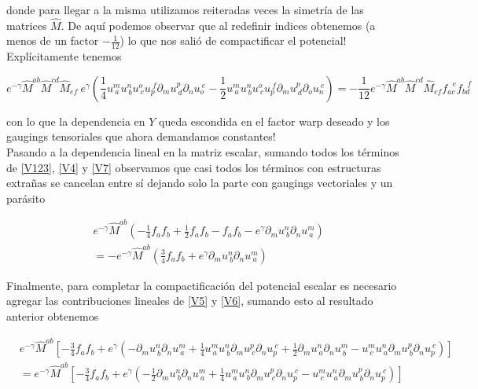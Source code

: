 \documentclass{article}
\numberwithin{equation}{section}
\begin{document}
donde para llegar a la misma utilizamos reiteradas veces la simetría de las matrices $ \hat{M} $. De aquí podemos observar que al redefinir indices obtenemos (a menos de un factor $ -\frac{1}{12} $) lo que nos salió de compactificar el potencial! Explícitamente tenemos

\begin{equation}\label{potencialMMM}
e^{-\gamma} \hat{M}^{a b} \hat{M}^{c d}\hat{M}_{e f} \ e^{\gamma}  \left( \frac{1}{4}u^{m}_{\ a} u^{n}_{\ b} u^{o}_{\ c} u_{p}^{\ f} \partial_m u^{p}_{\ d} \partial_n u_{o}^{\ e} - \frac{1}{2}u^{m}_{\ a} u^{n}_{\ b} u^{o}_{\ c} u_{p}^{\ f} \partial_m u^{p}_{\ d} \partial_o u_{n}^{\ e} \right) = -\frac{1}{12} e^{-\gamma} \hat{M}^{a b} \hat{M}^{c d}\hat{M}_{e f} f_{a c}^{\ \ \ e} f_{b d}^{\ \ \ f}
\end{equation}

con lo que la dependencia en $ Y $ queda escondida en el factor warp deseado y los gaugings tensoriales que ahora demandamos constantes!\\

Pasando a la dependencia lineal en la matriz escalar, sumando todos los términos de \ref{V123}, \ref{V4} y \ref{V7} observamos que casi todos los términos con estructuras extrañas se cancelan entre sí dejando solo la parte con gaugings vectoriales y un parásito

\begin{equation}
\begin{aligned}
&e^{-\gamma} \hat{M}^{a b} \left( - \frac{1}{4} f_a f_b + \frac{1}{2} f_a f_b - f_a f_b - e^{\gamma} \partial_m u^{n}_{\ b} \partial_n u^{m}_{\ a}\right)\\
&= - e^{-\gamma} \hat{M}^{a b} \left( \frac{3}{4} f_a f_b + e^{\gamma} \partial_m u^{n}_{\ b} \partial_n u^{m}_{\ a}\right) 
\end{aligned}
\end{equation}

Finalmente, para completar la compactificación del potencial escalar es necesario agregar las contribuciones lineales de \ref{V5} y \ref{V6}, sumando esto al resultado anterior obtenemos

\begin{equation}\label{auxiliarpotencial}
\begin{aligned}
&e^{-\gamma} \hat{M}^{a b} \left[ -\frac{3}{4} f_a f_b + e^{\gamma} \left( - \partial_m u^{n}_{\ b} \partial_n u^{m}_{\ a} + \frac{1}{4} u^{m}_{\ a} u^{n}_{\ b} \partial_m u^{p}_{\ c}  \partial_n u_{p}^{\ c} + \frac{1}{2} \partial_m u^{n}_{\ a} \partial_n u^{m}_{\ b} - u^{m}_{\ c} u^{n}_{\ a} \partial_m u^{p}_{\ b} \partial_n u_{p}^{\ c} \right) \right] \\
&= e^{-\gamma} \hat{M}^{a b} \left[ -\frac{3}{4} f_a f_b + e^{\gamma} \left( - \frac{1}{2}\partial_m u^{n}_{\ b} \partial_n u^{m}_{\ a} + \frac{1}{4} u^{m}_{\ a} u^{n}_{\ b} \partial_m u^{p}_{\ c}  \partial_n u_{p}^{\ c} - u^{m}_{\ c} u^{n}_{\ a} \partial_m u^{p}_{\ b} \partial_n u_{p}^{\ c} \right) \right]
\end{aligned}
\end{equation}
\end{document}
